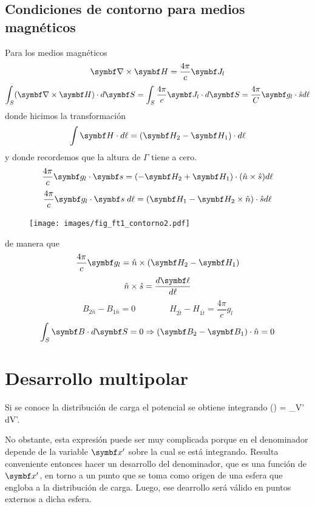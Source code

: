 \documentclass[10pt,oneside]{CBFT_book}
\begin{document}

\subsection{Condiciones de contorno para medios magnéticos}

Para los medios magnéticos
\[
	\rotorm{H} = \frac{4 \pi}{c} \vb{J}_l
\]
\[
	\int_S (\rotorm{H}) \cdot d\vb{S} = \int_S \frac{4 \pi}{c} \vb{J}_l \cdot d\vb{S} = 
	\frac{4 \pi}{C} \vb{g}_l\cdot \hat{s} d\ell
\]
donde hicimos la transformación
\[
	\int \vb{H}\cdot d\ell = (\vb{H}_2-\vb{H}_1)\cdot d\ell
\]
y donde recordemos que la altura de $\Gamma$ tiene a cero.
\[
	\frac{4 \pi}{c} \vb{g}_l \cdot \vb{s} = ( -\vb{H}_2 + \vb{H}_1 )\cdot( \hat{n} \times \hat{s} ) d\ell
\]
\[
	\frac{4 \pi}{c} \vb{g}_l \cdot \vb{s} \; d\ell = (\vb{H}_1 -\vb{H}_2 \times \hat{n})\cdot \hat{s} 
d\ell
\]

\begin{figure}[htb]
	\begin{center}
	\texttt{[image: images/fig\_ft1\_contorno2.pdf]}	 
	\end{center}
	\caption{}
\end{figure} 

de manera que 
\[
	\frac{4 \pi}{c} \vb{g}_l = \hat{n} \times ( \vb{H}_2 - \vb{H}_1 )
\]
\[
	\hat{n}\times\hat{s} = \frac{d\vb{\ell}}{d\ell} 
\]
\[
	B_{2\hat{n}} - B_{1\hat{n}} = 0 \qquad \qquad H_{2\hat{t}} - H_{1\hat{t}} = \frac{4 \pi}{c} g_l
\]
\[
	\int_S \vb{B}\cdot d\vb{S} = 0 \Rightarrow (\vb{B}_2 - \vb{B}_1 )\cdot\hat{n} = 0
\]

\section{Desarrollo multipolar}

Si se conoce la distribución de carga el potencial se obtiene integrando
\be
	\phi() = \int_{V'}  \; dV'.
	\label{integral_potencial}
\ee

No obstante, esta expresión puede ser muy complicada porque en el denominador depende de la variable 
$\vbx'$ sobre la cual se está integrando. 
Resulta conveniente entonces hacer un desarrollo del denominador, que es una función de $\vbx'$, en
torno a un punto que se toma como origen de una esfera que engloba a la distribución de carga.
Luego, ese dearrollo será válido en puntos externos a dicha esfera.
\end{document}
